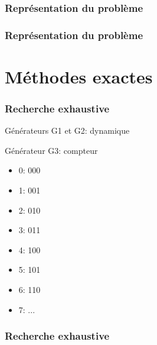 \documentclass[aspectratio=169,11pt]{beamer}
\begin{document}

	\begin{frame}
		\frametitle{Représentation du problème}
		\centering%
		\resizebox{0.8\textwidth}{!}{}%
	\end{frame}

	\begin{frame}
		\frametitle{Représentation du problème}
		\centering%
		\resizebox{\textwidth}{!}{}%
	\end{frame}

	\section{Méthodes exactes}

	\begin{frame}[t]
		\frametitle{Recherche exhaustive}
		\hfill%
		\begin{minipage}[t]{0.45\linewidth}
			\begin{block}{Générateurs G1 et G2: dynamique}
				\centering\resizebox{0.98\textwidth}{!}{}%
			\end{block}
		\end{minipage}
		\hfill%
		\begin{minipage}[t]{0.45\linewidth}
			\begin{block}{Générateur G3: compteur}
				\begin{itemize}
					\item 0: 000
					\item 1: 001
					\item 2: 010
					\item 3: 011
					\item 4: 100
					\item 5: 101
					\item 6: 110
					\item 7: ...
				\end{itemize}
			\end{block}
		\end{minipage}
		\hfill\hspace{0pt}
	\end{frame}

	\begin{frame}
		\frametitle{Recherche exhaustive}
		\centering\footnotesize
	\end{frame}
\end{document}

